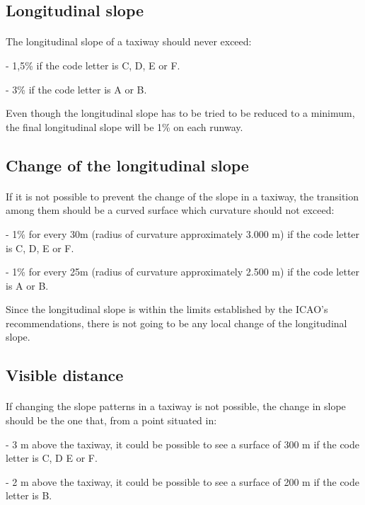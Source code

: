 		\subsection{Longitudinal slope}
		\paragraph{}The longitudinal slope of a taxiway should never exceed:
		
		-	1,5\% if the code letter is C, D, E or F.
		
		-	3\% if the code letter is A or B.
		
		Even though the longitudinal slope has to be tried to be reduced to a minimum, the final longitudinal slope will be 1\% on each runway.
				
		\subsection{Change of the longitudinal slope}
		\paragraph{}If it is not possible to prevent the change of the slope in a taxiway, the transition among them should be a curved surface which curvature should not exceed:
		
		-	1\% for every 30m (radius of curvature approximately 3.000 m) if the code letter is C, D, E or F.
		
		-	1\% for every 25m (radius of curvature approximately 2.500 m) if the code letter is A or B.
	
		Since the longitudinal slope is within the limits established by the ICAO's recommendations, there is not going to be any local change of the longitudinal slope.
		
		\subsection{Visible distance}
		\paragraph{}If changing the slope patterns in a taxiway is not possible, the change in slope should be the one that, from a point situated in:
	
		-	3 m above the taxiway, it could be possible to see a surface of 300 m if the code letter is C, D E or F.
	
		-	2 m above the taxiway, it could be possible to see a surface of 200 m if the code letter is B.
	
